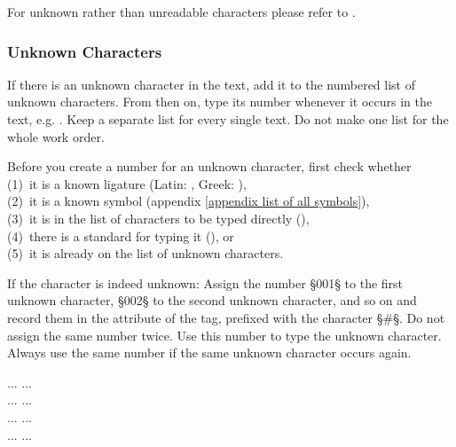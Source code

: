 \begin{crossref}
For unknown rather than unreadable characters please refer to .
\end{crossref}


\subsubsection{Unknown Characters}
\label{section unknown characters}

\begin{mainrule}
If there is an unknown character in the text, add it to the numbered
list of unknown characters. From then on, type its number whenever it
occurs in the text, e.g. . Keep a separate list for every
single text. Do not make one list for the whole work order.
\end{mainrule}

\begin{clarification}
Before you create a number for an unknown character, first check whether \\
(1)~it is a known ligature (Latin: , Greek: ), \\
(2)~it is a known symbol (appendix \ref{appendix list of all symbols}), \\
(3)~it is in the list of characters to be typed directly (), \\
(4)~there is a standard for typing it (), or \\
(5)~it is already on the list of unknown characters.
 \end{clarification}

\begin{clarification}
If the character is indeed unknown: Assign the number §001§ to the first unknown character, §002§ to the second unknown character, and so on and record them in the  attribute of the  tag, prefixed with the character §#§. Do not assign the same number twice. Use this number to type the unknown character. Always use the same number if the same unknown character occurs again.
\end{clarification}

\begin{typeLatin}
 ...  ...  \\
 ...  ...  \\
 ...  ...  \\
 ...  ...
\end{typeLatin}


